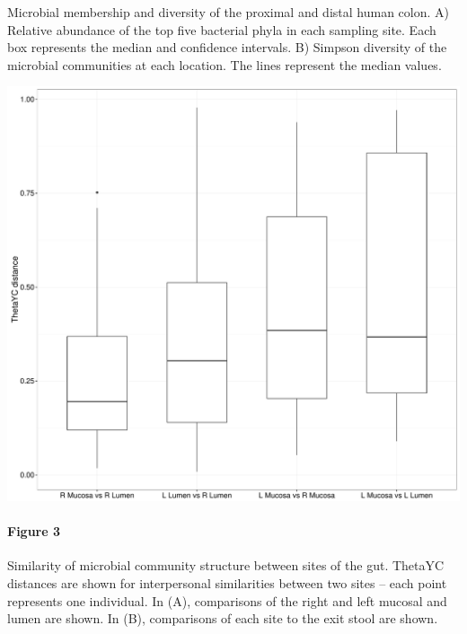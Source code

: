\documentclass[11pt,]{article}
\let\oldparagraph\paragraph
\renewcommand{\paragraph}[1]{\oldparagraph{#1}\mbox{}}
\begin{document}
Microbial membership and diversity of the proximal and distal human
colon. A) Relative abundance of the top five bacterial phyla in each
sampling site. Each box represents the median and confidence intervals.
B) Simpson diversity of the microbial communities at each location. The
lines represent the median values.

\newpage

\includegraphics{submission/figure_3.pdf}

\paragraph{Figure 3}\label{figure-3}

Similarity of microbial community structure between sites of the gut.
ThetaYC distances are shown for interpersonal similarities between two
sites -- each point represents one individual. In (A), comparisons of
the right and left mucosal and lumen are shown. In (B), comparisons of
each site to the exit stool are shown.

\newpage
\end{document}
